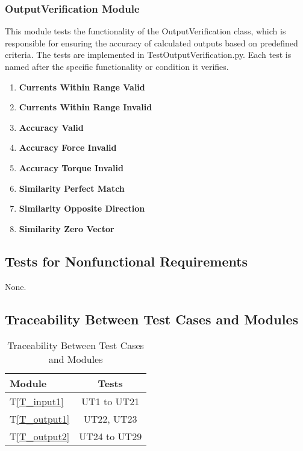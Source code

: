 \documentclass[12pt, titlepage]{article}
\newcommand{\tref}[1]{T\ref{#1}}
\newcommand{\UTthettnum}{UT\theuttnum}
\begin{document}
\subsubsection{OutputVerification Module}

This module tests the functionality of the OutputVerification class, which is responsible for ensuring the accuracy of calculated outputs based on predefined criteria. The tests are implemented in TestOutputVerification.py. Each test is named after the specific functionality or condition it verifies.
\begin{enumerate}
  \item[\refstepcounter{uttnum} \UTthettnum:] \textbf{Currents Within Range Valid}
  \item[\refstepcounter{uttnum} \UTthettnum:] \textbf{Currents Within Range Invalid}
  \item[\refstepcounter{uttnum} \UTthettnum:] \textbf{Accuracy Valid}
  \item[\refstepcounter{uttnum} \UTthettnum:] \textbf{Accuracy Force Invalid}
  \item[\refstepcounter{uttnum} \UTthettnum:] \textbf{Accuracy Torque Invalid}
  \item[\refstepcounter{uttnum} \UTthettnum:] \textbf{Similarity Perfect Match}
  \item[\refstepcounter{uttnum} \UTthettnum:] \textbf{Similarity Opposite Direction}
  \item[\refstepcounter{uttnum} \UTthettnum:] \textbf{Similarity Zero Vector}
\end{enumerate}

\subsection{Tests for Nonfunctional Requirements}
None.

\subsection{Traceability Between Test Cases and Modules}

\begin{table}[h]
  \centering
  \caption{Traceability Between Test Cases and Modules}
  \vspace{3mm}
  \label{tab:my-table}
  \begin{tabular}{l|c}
    Module         & Tests \\ \hline
    \tref{T_input1} & UT1 to UT21\\
    \tref{T_output1} & UT22, UT23\\
    \tref{T_output2} &  UT24 to UT29\\
  \end{tabular}
 \end{table}
				
\end{document}
